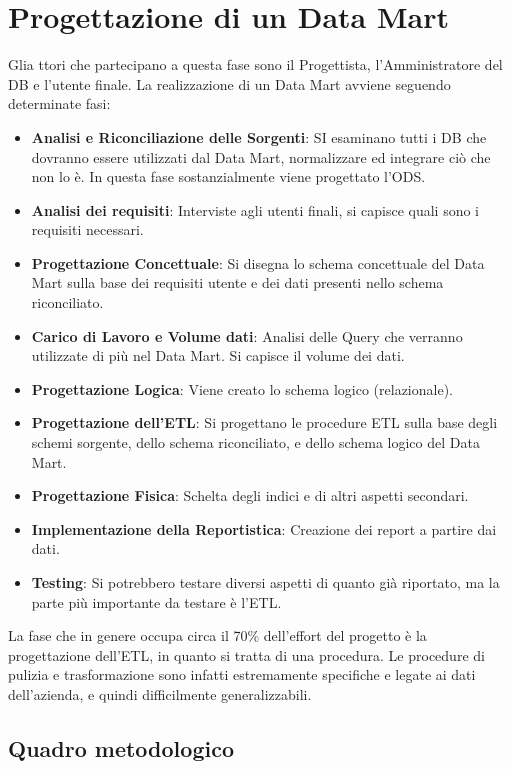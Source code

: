 
\section{Progettazione di un Data Mart}
Glia ttori che partecipano a questa fase sono il Progettista, l'Amministratore del DB e l'utente finale.
La realizzazione di un Data Mart avviene seguendo determinate fasi:
\begin{itemize}
	\item \textbf{Analisi e Riconciliazione delle Sorgenti}: SI esaminano tutti i DB che dovranno essere utilizzati dal Data Mart, normalizzare ed integrare ciò che non lo è. In questa fase sostanzialmente viene progettato l'ODS.
	\item \textbf{Analisi dei requisiti}: Interviste agli utenti finali, si capisce quali sono i requisiti necessari.
	\item \textbf{Progettazione Concettuale}: Si disegna lo schema concettuale del Data Mart sulla base dei requisiti utente e dei dati presenti nello schema riconciliato.
	\item \textbf{Carico di Lavoro e Volume dati}: Analisi delle Query che verranno utilizzate di più nel Data Mart. Si capisce il volume dei dati.
	\item \textbf{Progettazione Logica}: Viene creato lo schema logico (relazionale).
	\item \textbf{Progettazione dell'ETL}: Si progettano le procedure ETL sulla base degli schemi sorgente, dello schema riconciliato, e dello schema logico del Data Mart.
	\item \textbf{Progettazione Fisica}: Schelta degli indici e di altri aspetti secondari.
	\item \textbf{Implementazione della Reportistica}: Creazione dei report a partire dai dati.
	\item \textbf{Testing}: Si potrebbero testare diversi aspetti di quanto già riportato, ma la parte più importante da testare è l'ETL.
\end{itemize}
La fase che in genere occupa circa il 70\% dell'effort del progetto è la progettazione dell'ETL, in quanto si tratta di una procedura. Le procedure di pulizia e trasformazione sono infatti estremamente specifiche e legate ai dati dell'azienda, e quindi difficilmente generalizzabili.

\subsection{Quadro metodologico}

